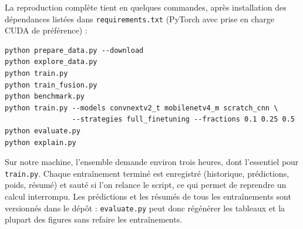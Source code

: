 La reproduction complète tient en quelques commandes, après installation des dépendances listées dans \texttt{requirements.txt} (PyTorch avec prise en charge CUDA de préférence) :
\begin{verbatim}
python prepare_data.py --download
python explore_data.py
python train.py
python train_fusion.py
python benchmark.py
python train.py --models convnextv2_t mobilenetv4_m scratch_cnn \
                --strategies full_finetuning --fractions 0.1 0.25 0.5
python evaluate.py
python explain.py
\end{verbatim}
Sur notre machine, l'ensemble demande environ trois heures, dont l'essentiel pour \texttt{train.py}. Chaque entraînement terminé est enregistré (historique, prédictions, poids, résumé) et sauté si l'on relance le script, ce qui permet de reprendre un calcul interrompu. Les prédictions et les résumés de tous les entraînements sont versionnés dans le dépôt : \texttt{evaluate.py} peut donc régénérer les tableaux et la plupart des figures sans refaire les entraînements.
